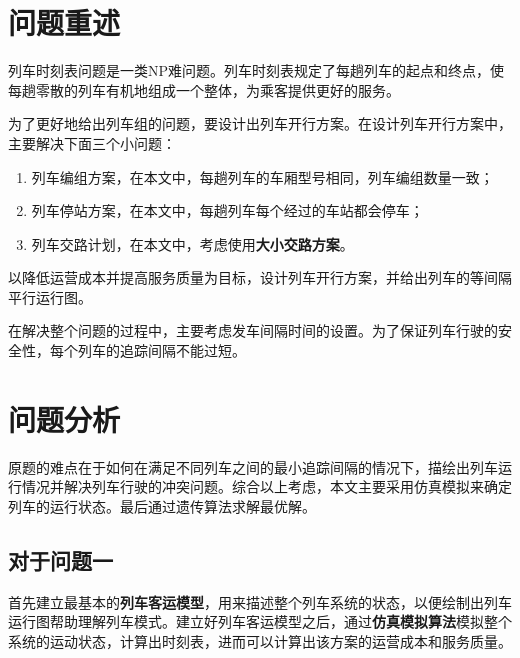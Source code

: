 \setcounter{page}{1}        %

%
%

\section{问题重述}
\label{que}


列车时刻表问题是一类NP难问题\cite{caoJiyuchengkedengdaishijiandechengshiguidaojiaotongliecheshikebiaoyouhuamoxingyusuanfayanjiu2021}。列车时刻表规定了每趟列车的起点和终点，使每趟零散的列车有机地组成一个整体，为乘客提供更好的服务。

为了更好地给出列车组的问题，要设计出列车开行方案。在设计列车开行方案中，主要解决下面三个小问题：

\begin{enumerate}
    \item 列车编组方案，在本文中，每趟列车的车厢型号相同，列车编组数量一致；
    \item 列车停站方案，在本文中，每趟列车每个经过的车站都会停车；
    \item 列车交路计划，在本文中，考虑使用\textbf{大小交路方案}。
\end{enumerate}

以降低运营成本并提高服务质量为目标，设计列车开行方案，并给出列车的等间隔平行运行图。

在解决整个问题的过程中，主要考虑发车间隔时间的设置。为了保证列车行驶的安全性，每个列车的追踪间隔不能过短。

%
%

\section{问题分析}

原题的难点在于如何在满足不同列车之间的最小追踪间隔的情况下，描绘出列车运行情况并解决列车行驶的冲突问题。综合以上考虑，本文主要采用仿真模拟来确定列车的运行状态。最后通过遗传算法求解最优解。

\subsection{对于问题一}

首先建立最基本的\textbf{列车客运模型}，用来描述整个列车系统的状态，以便绘制出列车运行图帮助理解列车模式。建立好列车客运模型之后，通过\textbf{仿真模拟算法}模拟整个系统的运动状态，计算出时刻表，进而可以计算出该方案的运营成本和服务质量。

